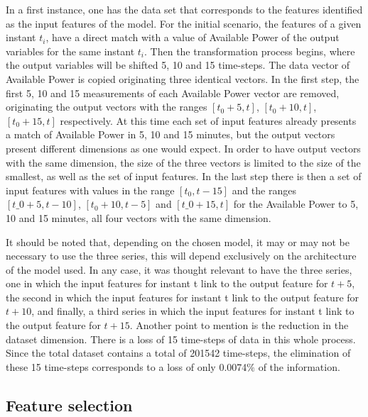 In a first instance, one has the data set that corresponds to the features identified as the input features of the model. For the initial scenario, the features of a given instant $t_i$, have a direct match with a value of Available Power of the output variables for the same instant $t_i$.  Then the transformation process begins, where the output variables will be shifted 5, 10 and 15 time-steps. The data vector of Available Power is copied originating three identical vectors. In the first step, the first 5, 10 and 15 measurements of each Available Power vector are removed, originating the output vectors with the ranges $[t_0 + 5, t]$, $[t_0 + 10, t]$, $[t_0 + 15, t]$ respectively. At this time each set of input features already presents a match of Available Power in 5, 10 and 15 minutes, but the output vectors present different dimensions as one would expect. In order to have output vectors with the same dimension, the size of the three vectors is limited to the size of the smallest, as well as the set of input features. In the last step there is then a set of input features with values in the range $[t_0, t-15]$ and the ranges $[t\_0 + 5, t-10]$, $[t_0 + 10, t-5]$ and $[t\_0 + 15, t]$ for the Available Power to 5, 10 and 15 minutes, all four vectors with the same dimension. 

It should be noted that, depending on the chosen model, it may or may not be necessary to use the three series, this will depend exclusively on the architecture of the model used. In any case, it was thought relevant to have the three series, one in which the input features for instant t link to the output feature for $t+5$, the second in which the input features for instant t link to the output feature for $t+10$, and finally, a third series in which the input features for instant t link to the output feature for $t+15$. Another point to mention is the reduction in the dataset dimension. There is a loss of 15 time-steps of data in this whole process. Since the total dataset contains a total of 201542 time-steps, the elimination of these 15 time-steps corresponds to a loss of only 0.0074$\%$ of the information.

\subsection{Feature selection}\label{chap3:subsec:feature_selection}

